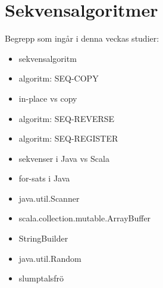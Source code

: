 \chapter{Sekvensalgoritmer}\label{chapter:W06}
Begrepp som ingår i denna veckas studier:
\begin{itemize}[noitemsep,label={$\square$},leftmargin=*]
\item sekvensalgoritm
\item algoritm: SEQ-COPY
\item in-place vs copy
\item algoritm: SEQ-REVERSE
\item algoritm: SEQ-REGISTER
\item sekvenser i Java vs Scala
\item for-sats i Java
\item java.util.Scanner
\item scala.collection.mutable.ArrayBuffer
\item StringBuilder
\item java.util.Random
\item slumptalsfrö\end{itemize}
